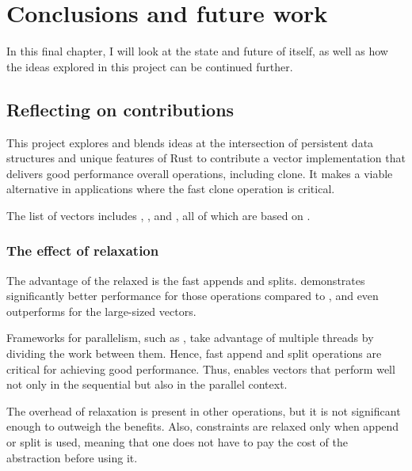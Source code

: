 

\chapter{Conclusions and future work}
In this final chapter, I will look at the state and future of \pvecrs{} itself, as well as how the ideas explored in this project can be continued further.

\section{Reflecting on contributions}
This project explores and blends ideas at the intersection of persistent data structures and unique features of Rust to contribute a vector implementation that delivers good performance overall operations, including clone. It makes \pvecrs{} a viable alternative in applications where the fast clone operation is critical. 

The list of vectors includes \rbvec{}, \rrbvec{}, and \pvec{}, all of which are based on \rrbtree{}. 

\subsection{The effect of relaxation}
The advantage of the relaxed \rbtree{} is the fast appends and splits. \rrbvec{} demonstrates significantly better performance for those operations compared to \rbvec{}, and even outperforms \stdvec{} for the large-sized vectors. 

Frameworks for parallelism, such as \rayon{}, take advantage of multiple threads by dividing the work between them. Hence, fast append and split operations are critical for achieving good performance. Thus, \rrbtree{} enables vectors that perform well not only in the sequential but also in the parallel context. 

The overhead of relaxation is present in other operations, but it is not significant enough to outweigh the benefits. Also, constraints are relaxed only when append or split is used, meaning that one does not have to pay the cost of the abstraction before using it. 

